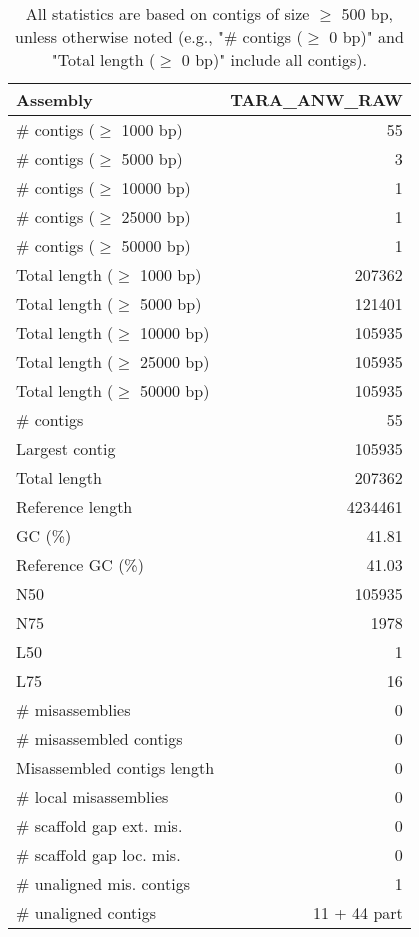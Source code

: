 \documentclass[12pt,a4paper]{article}
\begin{document}
\begin{table}[ht]
\begin{center}
\caption{All statistics are based on contigs of size $\geq$ 500 bp, unless otherwise noted (e.g., "\# contigs ($\geq$ 0 bp)" and "Total length ($\geq$ 0 bp)" include all contigs).}
\begin{tabular}{|l*{1}{|r}|}
\hline
Assembly & TARA\_ANW\_RAW \\ \hline
\# contigs ($\geq$ 1000 bp) & 55 \\ \hline
\# contigs ($\geq$ 5000 bp) & 3 \\ \hline
\# contigs ($\geq$ 10000 bp) & 1 \\ \hline
\# contigs ($\geq$ 25000 bp) & 1 \\ \hline
\# contigs ($\geq$ 50000 bp) & 1 \\ \hline
Total length ($\geq$ 1000 bp) & 207362 \\ \hline
Total length ($\geq$ 5000 bp) & 121401 \\ \hline
Total length ($\geq$ 10000 bp) & 105935 \\ \hline
Total length ($\geq$ 25000 bp) & 105935 \\ \hline
Total length ($\geq$ 50000 bp) & 105935 \\ \hline
\# contigs & 55 \\ \hline
Largest contig & 105935 \\ \hline
Total length & 207362 \\ \hline
Reference length & 4234461 \\ \hline
GC (\%) & 41.81 \\ \hline
Reference GC (\%) & 41.03 \\ \hline
N50 & 105935 \\ \hline
N75 & 1978 \\ \hline
L50 & 1 \\ \hline
L75 & 16 \\ \hline
\# misassemblies & 0 \\ \hline
\# misassembled contigs & 0 \\ \hline
Misassembled contigs length & 0 \\ \hline
\# local misassemblies & 0 \\ \hline
\# scaffold gap ext. mis. & 0 \\ \hline
\# scaffold gap loc. mis. & 0 \\ \hline
\# unaligned mis. contigs & 1 \\ \hline
\# unaligned contigs & 11 + 44 part \\ \hline

\end{tabular}
\end{center}
\end{table}
\end{document}
